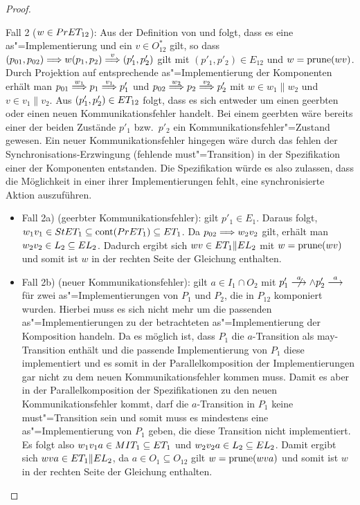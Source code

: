 \begin{proof}
\begin{itemize}
      Fall 2 ($w\in PrET _{12}$): Aus der Definition von \PrET{} und \prune{}
      folgt, dass es eine as"=Implementierung und ein $v\in O_{12}^*$ gilt, so
      dass $(p_{01},p_{02}) \weakmust{w} (p_1,p_2) \weakmust[v] (p'_1,p'_2)$
      gilt mit $(p'_1,p'_2)\in E_{12}$ und $w=\mathrm{prune} (wv)$. Durch Projektion
      auf entsprechende as"=Implementierung der Komponenten erhält man $p_{01}
      \weakmust[w_1] p_1 \weakmust[v_1] p'_1$ und $p_{02} \weakmust[w_2] p_2
      \weakmust[v_2] p'_2$ mit $w\in w_1\|w_2$ und $v\in v_1\|v_2$. Aus
      $(p'_1,p'_2)\in ET _{12}$ folgt, dass es sich entweder um einen geerbten
      oder einen neuen Kommunikationsfehler handelt. Bei einem geerbten wäre
      bereits einer der beiden Zustände $p'_1$ bzw.\ $p'_2$ ein
      Kommunikationsfehler"=Zustand gewesen. Ein neuer Kommunikationsfehler
      hingegen wäre durch das fehlen der Synchronisations-Erzwingung (fehlende
      must"=Transition) in der Spezifikation einer der Komponenten entstanden.
      Die Spezifikation würde es also zulassen, dass die Möglichkeit in einer
      ihrer Implementierungen fehlt, eine synchronisierte Aktion auszuführen.
    \begin{itemize}
      \item Fall 2a) (geerbter Kommunikationsfehler): \OBdA{} gilt $p'_1\in
        E_1$. Daraus folgt, $w_1v_1\in StET_1 \subseteq \mathrm{cont} (PrET _1)
        \subseteq ET _1$. Da $p_{02} \weakmust{w_2v_2}$ gilt, erhält man
        $w_2v_2\in L_2\subseteq EL _2$. Dadurch ergibt sich $wv\in ET _1\|EL
        _2$ mit $w=\mathrm{prune} (wv)$ und somit ist $w$ in der rechten Seite der
        Gleichung enthalten.
      \item Fall 2b) (neuer Kommunikationsfehler): \OBdA{} gilt $a\in I_1\cap
        O_2$ mit $p'_1\nmust[a]\land p'_2\must[a]$ für zwei
        as"=Implementierungen von $P_1$ und $P_2$, die in $P_{12}$ komponiert
        wurden. Hierbei muss es sich nicht mehr um die passenden
        as"=Implementierungen zu der betrachteten as"=Implementierung der
        Komposition handeln. Da es möglich ist, dass $P_1$ die $a$-Transition
        als may-Transition enthält und die passende Implementierung von $P_1$
        diese implementiert und es somit in der Parallelkomposition der
        Implementierungen gar nicht zu dem neuen Kommunikationsfehler kommen
        muss. Damit es aber in der Parallelkomposition der Spezifikationen zu
        den neuen Kommunikationsfehler kommt, darf die $a$-Transition in $P_1$
        keine must"=Transition sein und somit muss es mindestens eine
        as"=Implementierung von $P_1$ geben, die diese Transition nicht
        implementiert.\\
        Es folgt also $w_1v_1a\in MIT _1 \subseteq ET _1$ und $w_2v_2a\in L_2
        \subseteq EL _2$. Damit ergibt sich $wva\in ET _1\|EL_2$, da $a\in
        O_1\subseteq O_{12}$ gilt $w=\mathrm{prune} (wva)$ und somit ist $w$ in der
        rechten Seite der Gleichung enthalten.
    \end{itemize}
  \end{itemize}


\end{proof}
